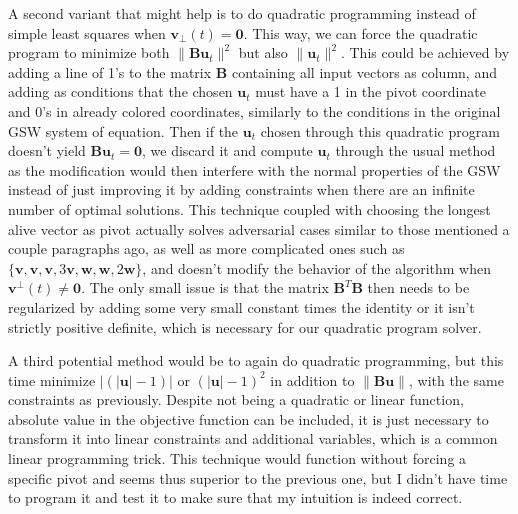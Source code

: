 \documentclass[12pt]{article}
\begin{document}

A second variant that might help is to do quadratic programming instead of simple least squares when $\textbf{v}_\perp(t)=\textbf{0}$. This way, we can force the quadratic program to minimize both $\|\textbf{Bu}_t\|^2$ but also $\|\textbf{u}_t\|^2$. This could be achieved by adding a line of 1's to the matrix $\textbf{B}$ containing all input vectors as column, and adding as conditions that the chosen $\textbf{u}_t$ must have a 1 in the pivot coordinate and 0's in already colored coordinates, similarly to the conditions in the original GSW system of equation. Then if the $\textbf{u}_t$ chosen through this quadratic program doesn't yield $\textbf{Bu}_t=\textbf{0}$, we discard it and compute $\textbf{u}_t$ through the usual method as the modification would then interfere with the normal properties of the GSW instead of just improving it by adding constraints when there are an infinite number of optimal solutions. This technique coupled with choosing the longest alive vector as pivot actually solves adversarial cases similar to those mentioned a couple paragraphs ago, as well as more complicated ones such as $\{\textbf{v},\textbf{v},\textbf{v},3\textbf{v},\textbf{w},\textbf{w},2\textbf{w}\}$, and doesn't modify the behavior of the algorithm when $\textbf{v}^\perp(t)\not=\textbf{0}$. The only small issue is that the matrix $\textbf{B}^T\textbf{B}$ then needs to be regularized by adding some very small constant times the identity or it isn't strictly positive definite, which is necessary for our quadratic program solver.

A third potential method would be to again do quadratic programming, but this time minimize $|(|\textbf{u}|-1)|$ or $(|\textbf{u}|-1)^2$ in addition to $\|\textbf{Bu}\|$, with the same constraints as previously. Despite not being a quadratic or linear function, absolute value in the objective function can be included, it is just necessary to transform it into linear constraints and additional variables, which is a common linear programming trick. This technique would function without forcing a specific pivot and seems thus superior to the previous one, but I didn't have time to program it and test it to make sure that my intuition is indeed correct.
\end{document}
